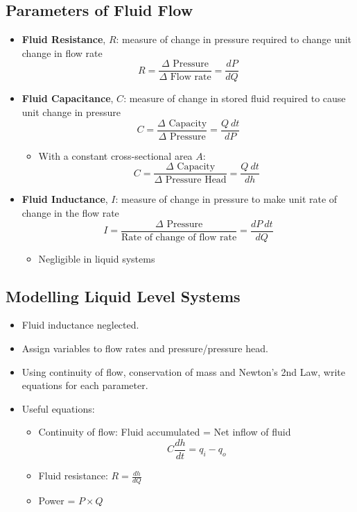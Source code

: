 \documentclass[a4paper]{article}
\begin{document}
\subsection{Parameters of Fluid Flow}
\begin{itemize}
    \item \textbf{Fluid Resistance}, $R$: measure of change in pressure required to change unit change in flow rate
    $$R = \frac{\Delta\text{ Pressure}}{\Delta\text{ Flow rate}}=\frac{dP}{dQ}$$
    \item \textbf{Fluid Capacitance}, $C$: measure of change in stored fluid required to cause unit change in pressure
    $$C = \frac{\Delta\text{ Capacity}}{\Delta\text{ Pressure}}=\frac{Q\ dt}{dP}$$
    \begin{itemize}[label=$\circ$]
        \item With a constant cross-sectional area $A$:
        $$C = \frac{\Delta\text{ Capacity}}{\Delta\text{ Pressure Head}}=\frac{Q\ dt}{dh}$$
    \end{itemize}
    \item \textbf{Fluid Inductance}, $I$: measure of change in pressure to make unit rate of change in the flow rate
    $$I = \frac{\Delta\text{ Pressure}}{\text{Rate of change of flow rate}} = \frac{dP\ dt}{dQ}$$
    \begin{itemize}[label=$\circ$]
        \item Negligible in liquid systems
    \end{itemize}
\end{itemize}

\subsection{Modelling Liquid Level Systems}
\begin{itemize}
    \item Fluid inductance neglected.
    \item Assign variables to flow rates and pressure/pressure head.
    \item Using continuity of flow, conservation of mass and Newton's 2nd Law, write equations for each parameter.
    \item Useful equations:
    \begin{itemize}[label=$\circ$]
        \item Continuity of flow: Fluid accumulated = Net inflow of fluid
        $$C\frac{dh}{dt} = q_i-q_o$$
        \item Fluid resistance: $\displaystyle R =\frac{dh}{dQ}$
        \item Power = $P\times Q$
    \end{itemize}
\end{itemize}
\end{document}
